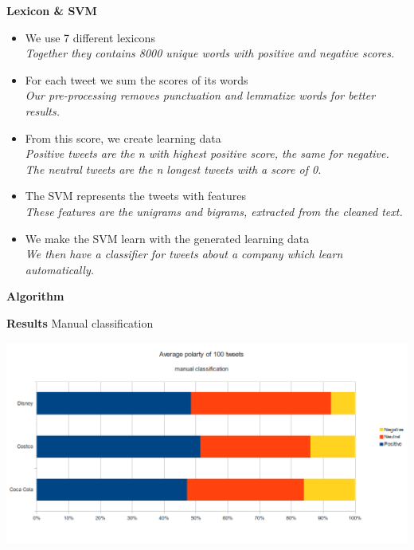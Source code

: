 \documentclass[landscape,20pt]{extarticle}
\newcommand*{\TitleFont}{\Huge \bf}
\newcommand*{\TextFont}{\normalsize \it}
\begin{document}
\clearpage
\thispagestyle{empty}

{\TitleFont Lexicon \& SVM}

\begin{itemize}
\item We use 7 different lexicons\\
{\TextFont Together they contains 8000 unique words with positive and negative scores.}
\item For each tweet we sum the scores of its words\\
{\TextFont Our pre-processing removes punctuation and lemmatize words for better results.}
\item From this score, we create learning data\\
{\TextFont Positive tweets are the \textit{n} with highest positive score, the same for negative.\\
The neutral tweets are the \textit{n} longest tweets with a score of 0.}
\item The SVM represents the tweets with features\\
{\TextFont These features are the unigrams and bigrams, extracted from the cleaned text.}
\item We make the SVM learn with the generated learning data\\
{\TextFont We then have a classifier for tweets about a company which learn automatically.}
\end{itemize}

\clearpage
\thispagestyle{empty}

{\TitleFont Algorithm}

\clearpage
\thispagestyle{empty}

{\TitleFont Results}
\newline
\small{Manual classification}
\newline
\newline
\newline
\newline
\centerline{\includegraphics[scale=0.85]{../img/man1.png}}
\end{document}
